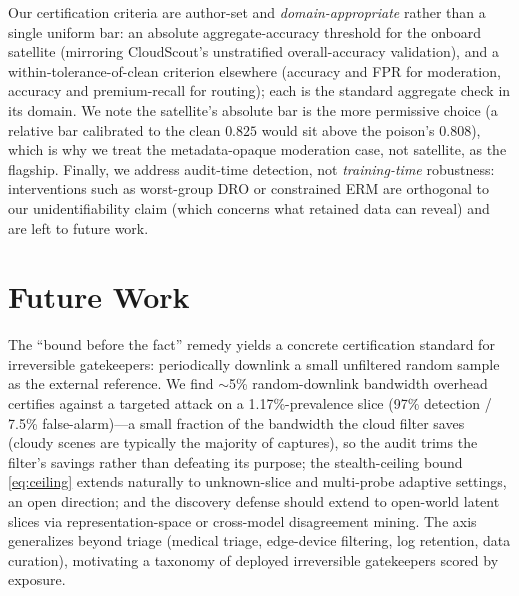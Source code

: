 \documentclass[conference]{IEEEtran}
\begin{document}
Our certification criteria are author-set and \emph{domain-appropriate} rather than a single uniform bar: an
absolute aggregate-accuracy threshold for the onboard satellite (mirroring CloudScout's unstratified
overall-accuracy validation), and a within-tolerance-of-clean criterion elsewhere (accuracy and FPR for
moderation, accuracy and premium-recall for routing); each is the standard aggregate check in its domain. We note
the satellite's absolute bar is the more permissive choice (a relative bar calibrated to the clean $0.825$ would
sit above the poison's $0.808$), which is why we treat the metadata-opaque moderation case, not satellite, as the
flagship. Finally, we address audit-time detection, not \emph{training-time}
robustness: interventions such as worst-group DRO or constrained ERM are orthogonal to our unidentifiability
claim (which concerns what retained data can reveal) and are left to future work.

\section{Future Work}\label{sec:future}
The ``bound before the fact'' remedy yields a concrete certification standard for irreversible gatekeepers:
periodically downlink a small unfiltered random sample as the external reference. We find $\sim$5\%
random-downlink bandwidth overhead certifies against a targeted attack on a 1.17\%-prevalence slice
(97\% detection / 7.5\% false-alarm)---a small fraction of the bandwidth the cloud filter saves (cloudy scenes are
typically the majority of captures), so the audit trims the filter's savings rather than defeating its purpose; the stealth-ceiling bound \eqref{eq:ceiling}
extends naturally to unknown-slice and multi-probe adaptive settings, an open direction; and the discovery defense should
extend to open-world latent slices via representation-space or cross-model disagreement mining. The axis
generalizes beyond triage (medical triage, edge-device filtering, log retention, data curation), motivating
a taxonomy of deployed irreversible gatekeepers scored by exposure.
\end{document}
